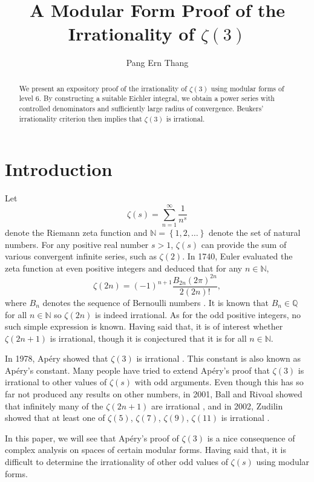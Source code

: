 \documentclass[12pt, a4paper]{amsart}
\title[A Modular Form Proof of the Irrationality of $\zeta\left(3\right)$]
 {A Modular Form Proof of the Irrationality of $\zeta\left(3\right)$}
\author{Pang Ern Thang \orcidlink{0009-0005-3447-4188}}
\theoremstyle{definition}
\numberwithin{theorem}{section}
\begin{document}
\maketitle \begin{abstract}
We present an expository proof of the irrationality of $\zeta\left(3\right)$ using modular forms of level 6. By constructing a suitable Eichler integral, we obtain a power series with controlled denominators and sufficiently large radius of convergence. Beukers' irrationality criterion then implies that $\zeta\left(3\right)$ is irrational.
\end{abstract}
\section{Introduction}
Let \[\zeta\left(s\right)=\sum_{n=1}^{\infty}\frac{1}{n^s}\]
denote the Riemann zeta function and $\mathbb{N}=\left\{1,2,\ldots\right\}$ denote the set of natural numbers. For any positive real number $s>1$, $\zeta\left(s\right)$ can provide the sum of various convergent infinite series, such as $\zeta\left(2\right)$. In 1740, Euler evaluated the zeta function at even positive integers and deduced that for any $n\in\mathbb{N}$, \[\zeta\left(2n\right)=\left(-1\right)^{n+1}\frac{B_{2n}\left(2\pi\right)^{2n}}{2\left(2n\right)!},\]
where $B_n$ denotes the sequence of Bernoulli numbers \cite{Apostol1973}. It is known that $B_n\in\mathbb{Q}$ for all $n\in\mathbb{N}$ so $\zeta\left(2n\right)$ is indeed irrational. As for the odd positive integers, no such simple expression is known. Having said that, it is of interest whether $\zeta\left(2n+1\right)$ is irrational, though it is conjectured that it is for all $n\in\mathbb{N}$.

In 1978, Apéry showed that $\zeta\left(3\right)$ is irrational \cite{Beukers1979}. This constant is also known as Apéry's constant. Many people have tried to extend Apéry's proof that $\zeta\left(3\right)$ is irrational to other values of $\zeta\left(s\right)$ with odd arguments. Even though this has so far not produced any results on other numbers, in 2001, Ball and Rivoal showed that infinitely many of the $\zeta\left(2n+1\right)$ are irrational \cite{BallRivoal2001}, and in 2002, Zudilin showed that at least one of $\zeta\left(5\right)$, $\zeta\left(7\right)$, $\zeta\left(9\right)$, $\zeta\left(11\right)$ is irrational \cite{Zudilin2001}. 

In this paper, we will see that Apéry's proof of $\zeta\left(3\right)$ is a nice consequence of complex analysis on spaces of certain modular forms. Having said that, it is difficult to determine the irrationality of other odd values of $\zeta\left(s\right)$ using modular forms.
\end{document}
